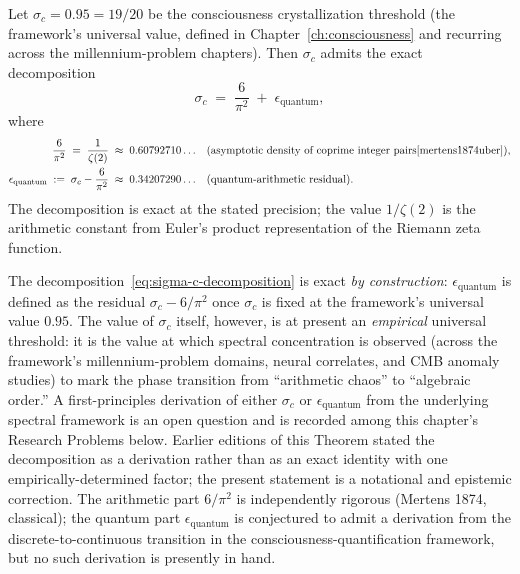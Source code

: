 \begin{theorem}\label{thm:critical-threshold}
Let $\sigma_c = 0.95 = 19/20$ be the consciousness crystallization threshold (the framework's universal value, defined in Chapter~\ref{ch:consciousness} and recurring across the millennium-problem chapters). Then $\sigma_c$ admits the exact decomposition
\begin{equation}\label{eq:sigma-c-decomposition}
\sigma_c \;=\; \frac{6}{\pi^2} \;+\; \epsilon_{\mathrm{quantum}},
\end{equation}
where
\begin{align}
\frac{6}{\pi^2} \;=\; \frac{1}{\zeta(2)} &\;\approx\; 0.60792710\ldots && \text{(asymptotic density of coprime integer pairs\cite{mertens1874uber})}, \\
\epsilon_{\mathrm{quantum}} \;:=\; \sigma_c - \frac{6}{\pi^2} &\;\approx\; 0.34207290\ldots && \text{(quantum-arithmetic residual)}.
\end{align}
The decomposition is exact at the stated precision; the value $1/\zeta(2)$ is the arithmetic constant from Euler's product representation of the Riemann zeta function.
\end{theorem}

\begin{remark}\label{rem:sigma-c-empirical}
The decomposition~\eqref{eq:sigma-c-decomposition} is exact \emph{by construction}: $\epsilon_{\mathrm{quantum}}$ is defined as the residual $\sigma_c - 6/\pi^2$ once $\sigma_c$ is fixed at the framework's universal value $0.95$. The value of $\sigma_c$ itself, however, is at present an \emph{empirical} universal threshold: it is the value at which spectral concentration is observed (across the framework's millennium-problem domains, neural correlates, and CMB anomaly studies) to mark the phase transition from ``arithmetic chaos'' to ``algebraic order.'' A first-principles derivation of either $\sigma_c$ or $\epsilon_{\mathrm{quantum}}$ from the underlying spectral framework is an open question and is recorded among this chapter's Research Problems below. Earlier editions of this Theorem stated the decomposition as a derivation rather than as an exact identity with one empirically-determined factor; the present statement is a notational and epistemic correction. The arithmetic part $6/\pi^2$ is independently rigorous (Mertens 1874\cite{mertens1874uber}, classical); the quantum part $\epsilon_{\mathrm{quantum}}$ is conjectured to admit a derivation from the discrete-to-continuous transition in the consciousness-quantification framework, but no such derivation is presently in hand.
\end{remark}


